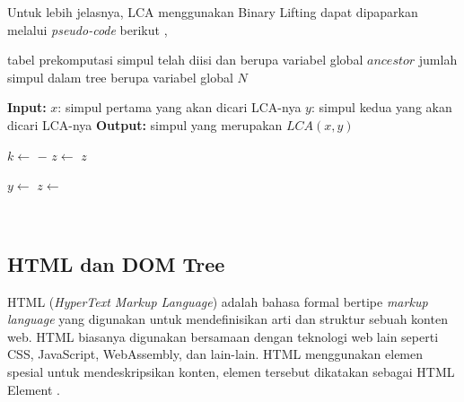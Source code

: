 \documentclass[12pt,a4paper]{article}
\begin{document}
Untuk lebih jelasnya, LCA menggunakan Binary Lifting dapat dipaparkan melalui \textit{pseudo-code} berikut \cite{cp-cses-book},
\begin{algorithm}[H]
    \caption{Solusi kueri LCA menggunakan teknik Binary Lifting} \label{alg:lca-binlift}
    \begin{algorithmic}
        \Require tabel prekomputasi simpul telah diisi dan berupa variabel global $ancestor$
        \Require jumlah simpul dalam tree berupa variabel global $N$
        \Statex

            \State \textbf{Input:} \; $x$: simpul pertama yang akan dicari LCA-nya
            \State \qquad \qquad $y$: simpul kedua yang akan dicari LCA-nya
            \State \textbf{Output:} simpul yang merupakan $LCA(x, y)$
            \Statex

                \State \Return {}
            \EndIf
            
            \Statex

            \State $k \gets $  $ - $ 
            \State $z \gets $  
                \State \Return $z$
            \EndIf

            \Statex

                    \State $y \gets $ 
                    \State $z \gets $ 
                \EndIf
            \EndFor
            \State \Return {}
        \EndFunction

    \end{algorithmic}
\end{algorithm} \\


\subsection{HTML dan DOM Tree}

HTML (\textit{HyperText Markup Language}) adalah bahasa formal bertipe \textit{markup language} yang digunakan untuk mendefinisikan
arti dan struktur sebuah konten web. HTML biasanya digunakan bersamaan dengan teknologi web lain seperti CSS, JavaScript, WebAssembly, dan lain-lain.
HTML menggunakan elemen spesial untuk mendeskripsikan konten, elemen tersebut dikatakan sebagai HTML Element \cite{mozilla-html}. \\
\end{document}
